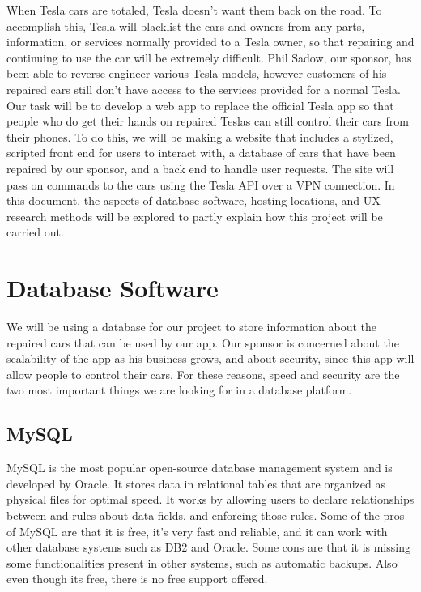 \documentclass[onecolumn, draftclsnofoot,10pt, compsoc]{IEEEtran}
\begin{document}
    When Tesla cars are totaled, Tesla doesn't want them back on the road. 
    To accomplish this, Tesla will blacklist the cars and owners from any parts, information, or services normally provided to a Tesla owner, so that repairing and continuing to use the car will be extremely difficult.
    Phil Sadow, our sponsor, has been able to reverse engineer various Tesla models, however customers of his repaired cars still don't have access to the services provided for a normal Tesla.
    Our task will be to develop a web app to replace the official Tesla app so that people who do get their hands on repaired Teslas can still control their cars from their phones.
    To do this, we will be making a website that includes a stylized, scripted front end for users to interact with, a database of cars that have been repaired by our sponsor, and a back end to handle user requests.
    The site will pass on commands to the cars using the Tesla API over a VPN connection.
    In this document, the aspects of database software, hosting locations, and UX research methods will be explored to partly explain how this project will be carried out.

\section{Database Software}

    We will be using a database for our project to store information about the repaired cars that can be used by our app.
    Our sponsor is concerned about the scalability of the app as his business grows, and about security, since this app will allow people to control their cars.
    For these reasons, speed and security are the two most important things we are looking for in a database platform.
    
    \subsection{MySQL}
    
        MySQL is the most popular open-source database management system and is developed by Oracle. 
        It stores data in relational tables that are organized as physical files for optimal speed.
        It works by allowing users to declare relationships between and rules about data fields, and enforcing those rules\cite{e2}.
        Some of the pros of MySQL are that it is free, it's very fast and reliable, and it can work with other database systems such as DB2 and Oracle.
        Some cons are that it is missing some functionalities present in other systems, such as automatic backups. Also even though its free, there is no free support offered\cite{e1}.
    
\end{document}
